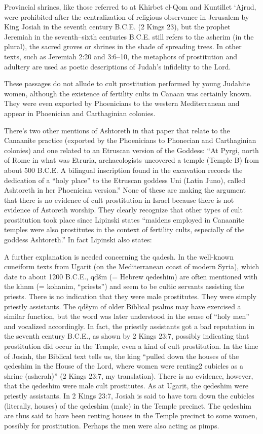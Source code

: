 \documentclass[11pt]{article}
\begin{document}
{Provincial shrines, like those referred to at Khirbet el-Qom and Kuntillet ‘Ajrud, were prohibited after the centralization of religious observance in Jerusalem by King Josiah in the seventh century B.C.E. (2 Kings 23), but the prophet Jeremiah in the seventh–sixth centuries B.C.E. still refers to the asherim (in the plural), the sacred groves or shrines in the shade of spreading trees. In other texts, such as Jeremiah 2:20 and 3:6–10, the metaphors of prostitution and adultery are used as poetic descriptions of Judah’s infidelity to the Lord.

These passages do not allude to cult prostitution performed by young Judahite women, although the existence of fertility cults in Canaan was certainly known. They were even exported by Phoenicians to the western Mediterranean and appear in Phoenician and Carthaginian colonies.

There’s two other mentions of Ashtoreth in that paper that relate to the Canaanite practice (exported by the Phoenicians to Phonecian and Carthaginian colonies) and one related to an Etruscan version of the Goddess: 
“At Pyrgi, north of Rome in what was Etruria, archaeologists uncovered a temple (Temple B) from about 500 B.C.E. A bilingual inscription found in the excavation records the dedication of a “holy place” to the Etruscan goddess Uni (Latin Juno), called Ashtoreth in her Phoenician version.”
None of these are making the argument that there is no evidence of cult prostitution in Israel because there is not evidence of Astoreth worship. They clearly recognize that other types of cult prostitution took place since Lipinski states “maidens employed in Canaanite temples were also prostitutes in the context of fertility cults, especially of the goddess Ashtoreth.” In fact Lipinski also states:

A further explanation is needed concerning the qadesh. In the well-known cuneiform texts from Ugarit (on the Mediterranean coast of modern Syria), which date to about 1200 B.C.E., qdšm (= Hebrew qedeshim) are often mentioned with the khnm (= kohanim, “priests”) and seem to be cultic servants assisting the priests. There is no indication that they were male prostitutes. They were simply priestly assistants. The qdšym of older Biblical psalms may have exercised a similar function, but the word was later understood in the sense of “holy men” and vocalized accordingly. In fact, the priestly assistants got a bad reputation in the seventh century B.C.E., as shown by 2 Kings 23:7, possibly indicating that prostitution did occur in the Temple, even a kind of cult prostitution. In the time of Josiah, the Biblical text tells us, the king “pulled down the houses of the qedeshim in the House of the Lord, where women were renting2 cubicles as a shrine (asherah)” (2 Kings 23:7, my translation). There is no evidence, however, that the qedeshim were male cult prostitutes. As at Ugarit, the qedeshim were priestly assistants. In 2 Kings 23:7, Josiah is said to have torn down the cubicles (literally, houses) of the qedeshim (male) in the Temple precinct. The qedeshim are thus said to have been renting houses in the Temple precinct to some women, possibly for prostitution. Perhaps the men were also acting as pimps.

}
\end{document}
